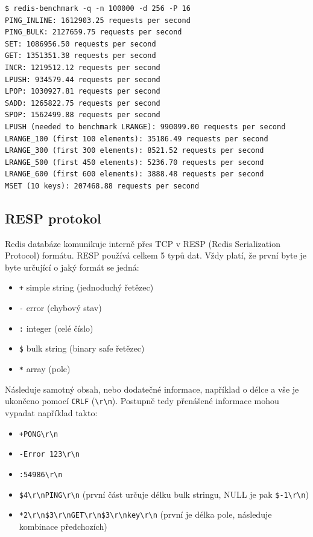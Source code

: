\begin{verbatim}
$ redis-benchmark -q -n 100000 -d 256 -P 16
PING_INLINE: 1612903.25 requests per second
PING_BULK: 2127659.75 requests per second
SET: 1086956.50 requests per second
GET: 1351351.38 requests per second
INCR: 1219512.12 requests per second
LPUSH: 934579.44 requests per second
LPOP: 1030927.81 requests per second
SADD: 1265822.75 requests per second
SPOP: 1562499.88 requests per second
LPUSH (needed to benchmark LRANGE): 990099.00 requests per second
LRANGE_100 (first 100 elements): 35186.49 requests per second
LRANGE_300 (first 300 elements): 8521.52 requests per second
LRANGE_500 (first 450 elements): 5236.70 requests per second
LRANGE_600 (first 600 elements): 3888.48 requests per second
MSET (10 keys): 207468.88 requests per second
\end{verbatim}


\subsection{RESP protokol}
Redis databáze komunikuje interně přes TCP  v RESP  (Redis Serialization Protocol) formátu. RESP používá celkem 5 typů dat. Vždy platí, že první byte je byte určující o jaký formát se jedná:

\begin{itemize}
\itemsep0em
\item \texttt{+} simple string (jednoduchý řetězec)
\item \texttt{-} error (chybový stav)
\item \texttt{:} integer (celé číslo)
\item \texttt{\$} bulk string (binary safe řetězec)
\item \texttt{*} array (pole)
\end{itemize}

Následuje samotný obsah, nebo dodatečné informace, například o délce a vše je ukončeno pomocí \texttt{CRLF} (\texttt{\textbackslash r\textbackslash n}). Postupně tedy přenášené informace mohou vypadat například takto:

\begin{itemize}
\itemsep0em
\item \texttt{+PONG\textbackslash r\textbackslash n}
\item \texttt{-Error 123\textbackslash r\textbackslash n}
\item \texttt{:54986\textbackslash r\textbackslash n}
\item \texttt{\$4\textbackslash r\textbackslash nPING\textbackslash r\textbackslash n} (první část určuje délku bulk stringu, NULL je pak \texttt{\$-1\textbackslash r\textbackslash n})
\item \texttt{*2\textbackslash r\textbackslash n\$3\textbackslash r\textbackslash nGET\textbackslash r\textbackslash n\$3\textbackslash r\textbackslash nkey\textbackslash r\textbackslash n} (první je délka pole, následuje kombinace předchozích)
\end{itemize}

